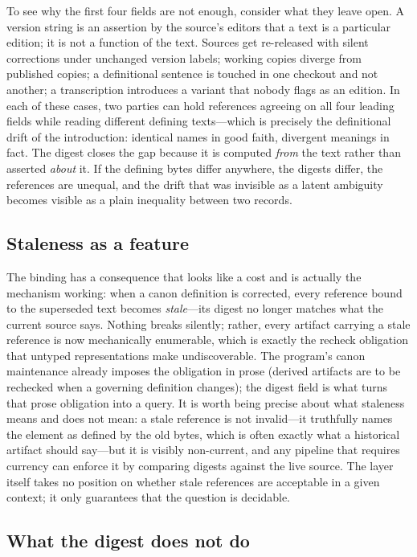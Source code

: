 To see why the first four fields are not enough, consider what
they leave open. A version string is an assertion by the source's
editors that a text is a particular edition; it is not a function
of the text. Sources get re-released with silent corrections under
unchanged version labels; working copies diverge from published
copies; a definitional sentence is touched in one checkout and not
another; a transcription introduces a variant that nobody flags as
an edition. In each of these cases, two parties can hold
references agreeing on all four leading fields while reading
different defining texts---which is precisely the definitional
drift of the introduction: identical names in good faith, divergent
meanings in fact. The digest closes the gap because it is computed
\emph{from} the text rather than asserted \emph{about} it. If the
defining bytes differ anywhere, the digests differ, the references
are unequal, and the drift that was invisible as a latent ambiguity
becomes visible as a plain inequality between two records.

\subsection{Staleness as a feature}\label{ch03:staleness}

The binding has a consequence that looks like a cost and is
actually the mechanism working: when a canon definition is
corrected, every reference bound to the superseded text becomes
\emph{stale}---its digest no longer matches what the current source
says. Nothing breaks silently; rather, every artifact carrying a
stale reference is now mechanically enumerable, which is exactly
the recheck obligation that untyped representations make
undiscoverable. The program's canon maintenance already imposes the
obligation in prose (derived artifacts are to be rechecked when a
governing definition changes); the digest field is what turns that
prose obligation into a query. It is worth being precise about what
staleness means and does not mean: a stale reference is not
invalid---it truthfully names the element as defined by the old
bytes, which is often exactly what a historical artifact should
say---but it is visibly non-current, and any pipeline that requires
currency can enforce it by comparing digests against the live
source. The layer itself takes no position on whether stale
references are acceptable in a given context; it only guarantees
that the question is decidable.

\subsection{What the digest does not do}\label{ch03:defhash-limits}

